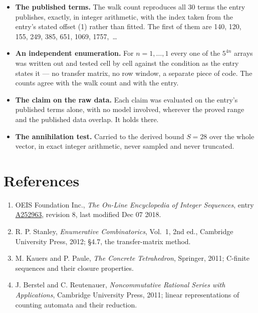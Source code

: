 \documentclass[11pt]{article}
\theoremstyle{definition}
\begin{document}
\begin{itemize}

\item {\bfseries The published terms.} The walk count reproduces all 30 terms the entry publishes, exactly, in integer arithmetic, with the index taken from the entry's stated offset (1) rather than fitted. The first of them are 140, 120, 155, 249, 385, 651, 1069, 1757,~\dots

\item {\bfseries An independent enumeration.} For $n = 1,\dots,1$ every one of the $5^{4n}$ arrays was written out and tested cell by cell against the condition as the entry states it --- no transfer matrix, no row window, a separate piece of code. The counts agree with the walk count and with the entry.

\item {\bfseries The claim on the raw data.} Each claim was evaluated on the entry's published terms alone, with no model involved, wherever the proved range and the published data overlap. It holds there.

\item {\bfseries The annihilation test.} Carried to the derived bound $S = 28$ over the whole vector, in exact integer arithmetic, never sampled and never truncated.

\end{itemize}

\section{References}

\begin{enumerate}

\item OEIS Foundation Inc., \emph{The On-Line Encyclopedia of Integer Sequences}, entry \href{https://oeis.org/A252963}{A252963}, revision 8, last modified Dec 07 2018.

\item R. P. Stanley, \emph{Enumerative Combinatorics}, Vol.~1, 2nd ed., Cambridge University Press, 2012; \S4.7, the transfer-matrix method.

\item M. Kauers and P. Paule, \emph{The Concrete Tetrahedron}, Springer, 2011; C-finite sequences and their closure properties.

\item J. Berstel and C. Reutenauer, \emph{Noncommutative Rational Series with Applications}, Cambridge University Press, 2011; linear representations of counting automata and their reduction.

\end{enumerate}
\end{document}
